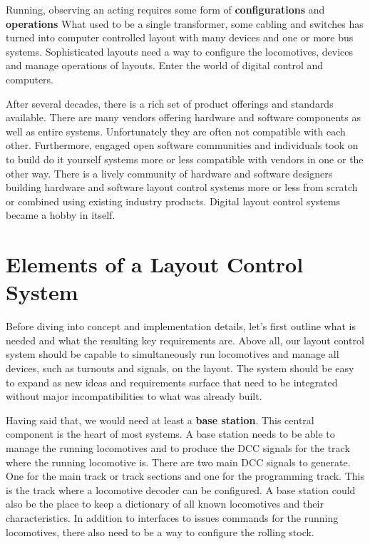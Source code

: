 Running, observing an acting requires some form of {\bf configurations} and {\bf operations} What used to be a single transformer, some cabling and switches has turned into computer controlled layout with many devices and one or more bus systems. Sophisticated layouts need a way to configure the locomotives, devices and manage operations of layouts. Enter the world of digital control and computers.

After several decades, there is a rich set of product offerings and standards available. There are many vendors offering hardware and software components as well as entire systems. Unfortunately they are often not compatible with each other. Furthermore, engaged open software communities and individuals took on to build do it yourself systems more or less compatible with vendors in one or the other way. There is a lively community of hardware and software designers building hardware and software layout control systems more or less from scratch or combined using existing industry products. Digital layout control systems became a hobby in itself.

\section{Elements of a Layout Control System}

Before diving into concept and implementation details, let's first outline what is needed and what the resulting key requirements are. Above all, our layout control system should be capable to simultaneously run locomotives and manage all devices, such as turnouts and signals, on the layout. The system should be easy to expand as new ideas and requirements surface that need to be integrated without major incompatibilities to what was already built.

Having said that, we would need at least a {\bf base station}. This central component is the heart of most systems. A base station needs to be able to manage the running locomotives and to produce the DCC signals for the track where the running locomotive is. There are two main DCC signals to generate. One for the main track or track sections and one for the programming track. This is the track where a locomotive decoder can be configured. A base station could also be the place to keep a dictionary of all known locomotives and their characteristics. In addition to interfaces to issues commands for the running locomotives, there also need to be a way to configure the rolling stock.

